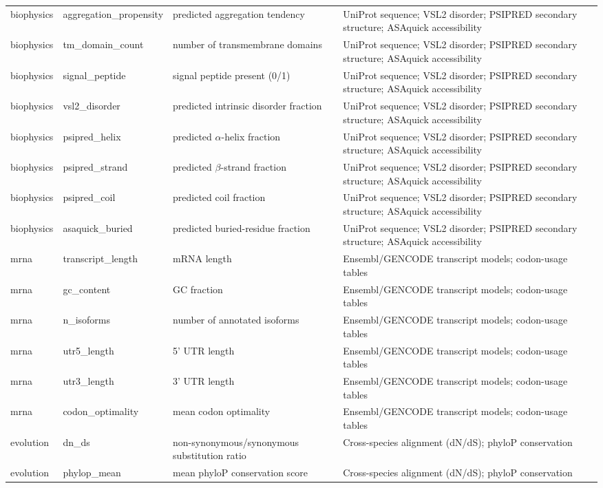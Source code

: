 \documentclass[times, twoside]{zHenriquesLab-StyleBioRxiv}
\begin{document}
\begin{table}[tbp]
{\begin{tabular}{@{}p{}p{}p{}p{}@{}}
biophysics & aggregation\_propensity & predicted aggregation tendency & UniProt sequence; VSL2 disorder; PSIPRED secondary structure; ASAquick accessibility \\
biophysics & tm\_domain\_count & number of transmembrane domains & UniProt sequence; VSL2 disorder; PSIPRED secondary structure; ASAquick accessibility \\
biophysics & signal\_peptide & signal peptide present (0/1) & UniProt sequence; VSL2 disorder; PSIPRED secondary structure; ASAquick accessibility \\
biophysics & vsl2\_disorder & predicted intrinsic disorder fraction & UniProt sequence; VSL2 disorder; PSIPRED secondary structure; ASAquick accessibility \\
biophysics & psipred\_helix & predicted $\alpha$-helix fraction & UniProt sequence; VSL2 disorder; PSIPRED secondary structure; ASAquick accessibility \\
biophysics & psipred\_strand & predicted $\beta$-strand fraction & UniProt sequence; VSL2 disorder; PSIPRED secondary structure; ASAquick accessibility \\
biophysics & psipred\_coil & predicted coil fraction & UniProt sequence; VSL2 disorder; PSIPRED secondary structure; ASAquick accessibility \\
biophysics & asaquick\_buried & predicted buried-residue fraction & UniProt sequence; VSL2 disorder; PSIPRED secondary structure; ASAquick accessibility \\
mrna & transcript\_length & mRNA length & Ensembl/GENCODE transcript models; codon-usage tables \\
mrna & gc\_content & GC fraction & Ensembl/GENCODE transcript models; codon-usage tables \\
mrna & n\_isoforms & number of annotated isoforms & Ensembl/GENCODE transcript models; codon-usage tables \\
mrna & utr5\_length & 5' UTR length & Ensembl/GENCODE transcript models; codon-usage tables \\
mrna & utr3\_length & 3' UTR length & Ensembl/GENCODE transcript models; codon-usage tables \\
mrna & codon\_optimality & mean codon optimality & Ensembl/GENCODE transcript models; codon-usage tables \\
evolution & dn\_ds & non-synonymous/synonymous substitution ratio & Cross-species alignment (dN/dS); phyloP conservation \\
evolution & phylop\_mean & mean phyloP conservation score & Cross-species alignment (dN/dS); phyloP conservation \\

\end{tabular}}
\end{table}
\end{document}
